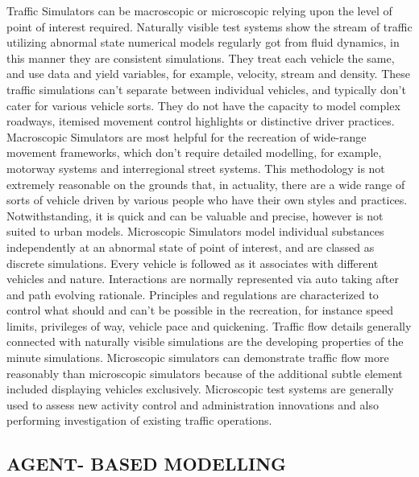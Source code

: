 \documentclass[11pt,a4paper]{article}
\begin{document}
Traffic Simulators can be macroscopic or microscopic relying upon the level of point of interest required. Naturally visible test systems show the stream of traffic utilizing abnormal state numerical models regularly got from fluid dynamics, in this manner they are consistent simulations. They treat each vehicle the same, and use data and yield variables, for example, velocity, stream and density. These traffic simulations can't separate between individual vehicles, and typically don't cater for various vehicle sorts. They do not have the capacity to model complex roadways, itemised movement control highlights or distinctive driver practices. Macroscopic Simulators are most helpful for the recreation of wide-range movement frameworks, which don't require detailed modelling, for example, motorway systems and interregional street systems. This methodology is not extremely reasonable on the grounds that, in actuality, there are a wide range of sorts of vehicle driven by various people who have their own styles and practices. Notwithstanding, it is quick and can be valuable and precise, however is not suited to urban models.\newline 
Microscopic Simulators model individual substances independently at an abnormal state of point of interest, and are classed as discrete simulations. Every vehicle is followed as it associates with different vehicles and nature. Interactions are normally represented via auto taking after and path evolving rationale. Principles and regulations are characterized to control what should and can't be possible in the recreation, for instance speed limits, privileges of way, vehicle pace and quickening. Traffic flow details generally connected with naturally visible simulations are the developing properties of the minute simulations. Microscopic simulators can demonstrate traffic flow more reasonably than microscopic simulators because of the additional subtle element included displaying vehicles exclusively. Microscopic test systems are generally used to assess new activity control and administration innovations and also performing investigation of existing traffic operations.


\subsection{AGENT- BASED MODELLING}
\end{document}
